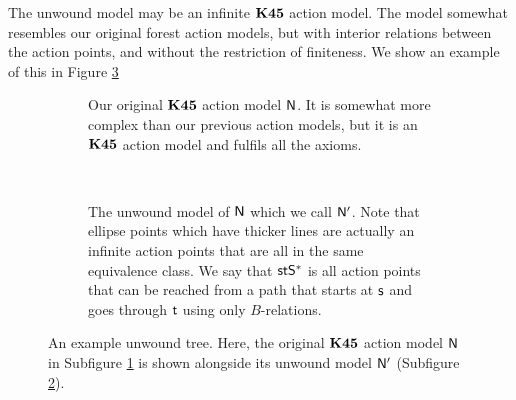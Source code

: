 The unwound model may be an infinite $\bf K45$ action model.
The model somewhat resembles our original forest action models,
but with interior relations between the action points, and without the
restriction of finiteness.
We show an example of this in Figure \ref{generatedTreeExample}

\begin{figure}
\centering
\begin{subfigure}[b]{.45\textwidth}
\centering
{}
\caption{Our original $\bf K45$ action model $\mathrm{\mathsf{N}}$.
It is somewhat more complex than our previous action models, but it is an
  $\bf K45$ action model and
fulfils all the axioms.}
\label{originalActionModel}
\end{subfigure}
~
\begin{subfigure}[b]{.45\textwidth}
\centering
{}
\caption{The unwound model of $\mathrm{\mathsf{N}}$ which we call $\mathrm{\mathsf{N}}'$. Note that ellipse points which
have thicker lines are actually an infinite action points that are all in the same equivalence class.
We say that $\mathrm{\mathsf{s}} \mathrm{\mathsf{t}} \mathrm{\mathsf{S}}^\ast$ is all action points that can be reached from a path that starts at $\mathrm{\mathsf{s}}$ and
goes through $\mathrm{\mathsf{t}}$ using only $B$-relations.}
\label{unwoundActionModel}
\end{subfigure}
\caption[Example of unwound tree]{An example unwound tree. Here, the original $\bf K45$ action model
$\mathrm{\mathsf{N}}$ in Subfigure \ref{originalActionModel} is shown alongside its unwound model $\mathrm{\mathsf{N}}'$
(Subfigure \ref{unwoundActionModel}). } \label{generatedTreeExample}
\end{figure}

